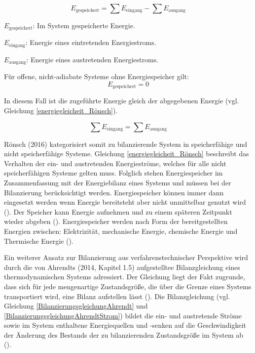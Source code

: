 \begin{equation}
E_{\text{gespeichert}} = \sum E_{\text{eingang}} - \sum E_{\text{ausgang}}
\label{energiebilanzierungsgleichung_Rönsch}
\end{equation}

\begin{description}
    \item \(E_{\text{gespeichert}}\): Im System gespeicherte Energie.
    \item \(E_{\text{eingang}}\): Energie eines eintretenden Energiestroms.
    \item \(E_{\text{ausgang}}\): Energie eines austretenden Energiestroms.
    \item Für offene, nicht-adiabate Systeme ohne Energiespeicher gilt:
    \[
    E_{\text{gespeichert}} = 0
    \]
    \item In diesem Fall ist die zugeführte Energie gleich der abgegebenen Energie (vgl. Gleichung \eqref{energiegleicheit_Rönsch}).
\end{description}

\begin{equation}
    \sum E_{\text{eingang}} = \sum E_{\text{ausgang}}
    \label{energiegleicheit_Rönsch}
\end{equation}

Rönsch (2016) kategorisiert somit zu bilanzierende System in speicherfähige und nicht speicherfähige Systeme.
Gleichung \eqref{energiegleicheit_Rönsch} beschreibt das Verhalten der ein- und austretenden Energieströme, welches für alle 
nicht speicherfähigen Systeme gelten muss.
Folglich stehen Energiespeicher im Zusammenfassung mit der Energiebilanz eines Systems und müssen bei der Bilanzierung berücksichtigt werden.
Energiespeicher können immer dann eingesetzt werden wenn Energie bereitsteht aber nicht unmittelbar genutzt wird (\cite[S. 1]{Rathgeber.2018}).
Der Speicher kann Energie aufnehmen und zu einem späteren Zeitpunkt wieder abgeben (\cite[S. 1]{Rathgeber.2018}).
Energiespeicher werden nach Form der bereitgestellten Energien zwischen: Elektrizität, mechanische Energie, chemische Energie und Thermische 
Energie (\cite[S. 1]{Rathgeber.2018}).


Ein weiterer Ansatz zur Bilanzierung aus verfahrenstechnischer Perspektive wird durch die von Ahrendts (2014, Kapitel 1.5) aufgestelltee Bilanzgleichung eines 
thermodynamischen Systems adressiert.
Der Gleichung liegt der Fakt zugrunde, dass sich für jede mengenartige Zustandsgröße, die über die Grenze eines Systems transportiert wird, eine Bilanz aufstellen lässt 
(\cite[Kapitel 1.5]{Ahrendts.2014}).
Die Bilanzgleichung (vgl. Gleichung \eqref{BilanzierungsgleichungAhrendt} und \eqref{BilanzierungsgleichungAhrendtStrom}) 
bildet die ein- und austretende Ströme sowie im System enthaltene Energiequellen und -senken auf die Geschwindigkeit der Änderung des Bestands der 
zu bilanzierenden Zustandsgröße im System ab (\cite[Kapitel 1.5]{Ahrendts.2014}).

